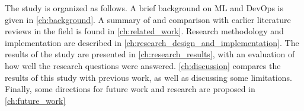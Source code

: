 The study is organized as follows.
A brief background on ML and DevOps is given in \cref{ch:background}.
A summary of and comparison with earlier literature reviews in the field is found in \cref{ch:related_work}.
Research methodology and implementation are described in \cref{ch:research_design_and_implementation}.
The results of the study are presented in \cref{ch:research_results}, with an evaluation of how well the research questions were answered.
\cref{ch:discussion} compares the results of this study with previous work, as well as discussing some limitations.
Finally, some directions for future work and research are proposed in \cref{ch:future_work}

